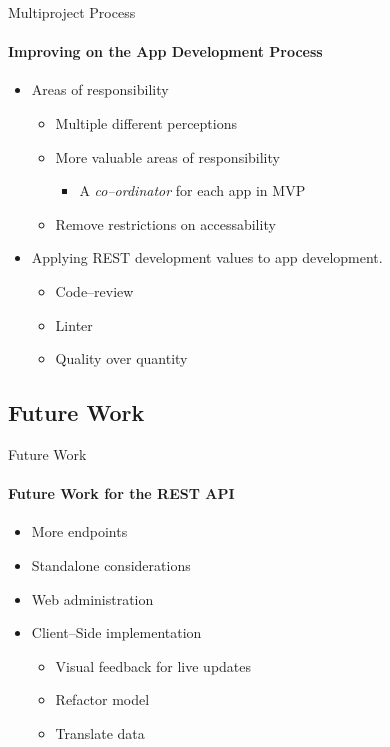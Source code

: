     \begin{frame}[t]{Multiproject Process}\framesubtitle{Improving on the App Development Process}
        \begin{itemize}
            \item Areas of responsibility
            \begin{itemize}
                \item Multiple different perceptions
                \item More valuable areas of responsibility
                \begin{itemize}
                    \item A \textit{co--ordinator} for each app in MVP
                \end{itemize}
                \item Remove restrictions on accessability
            \end{itemize}
            \bigskip
            \item Applying REST development values to app development.
            \begin{itemize}
                \item Code--review
                \item Linter
                \item Quality over quantity
            \end{itemize}
        \end{itemize}
    \end{frame}

    \subsection{Future Work}
    \begin{frame}[t]{Future Work}\framesubtitle{Future Work for the REST API}
        \begin{itemize}
            \item More endpoints
            \item Standalone considerations
            \item Web administration
            \item Client--Side implementation
            \begin{itemize}
                \item Visual feedback for live updates
                \item Refactor model
                \item Translate data
            \end{itemize}
        \end{itemize}
    \end{frame}